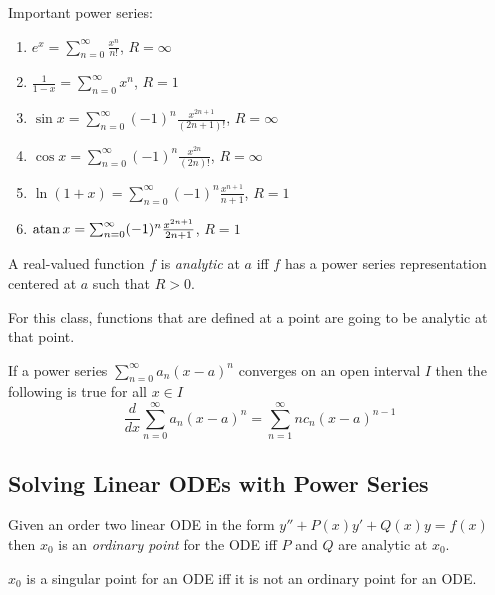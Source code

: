 \documentclass[notes]{subfiles}
\begin{document}
Important power series:
\begin{enumerate}[label = (\arabic*)]
    \item $e^x = \sum_{n = 0}^\infty \frac{x^n}{n!}$, $R = \infty$
    \item $\frac{1}{1 - x} = \sum_{n = 0}^\infty x^n$, $R = 1$
    \item $\sin x = \sum_{n = 0}^\infty (-1)^n \frac{x^{2n + 1}}{(2n + 1)!}$, $R = \infty$
    \item $\cos x = \sum_{n = 0}^\infty (-1)^n \frac{x^{2n}}{(2n)!}$, $R = \infty$
    \item $\ln(1 + x) = \sum_{n = 0}^\infty (-1)^n \frac{x^{n + 1}}{n + 1}$, $R = 1$
    \item $\operatorname{atan} x = \sum_{n = 0}^\infty (-1)^n \frac{x^{2n + 1}}{2n + 1}$, $R = 1$
\end{enumerate}

\begin{definition}
    A real-valued function $f$ is \textsl{analytic} at $a$ iff $f$ has a power series representation centered at $a$ such that $R > 0$.
\end{definition}

For this class, functions that are defined at a point are going to be analytic at that point.

\begin{theorem}
    If a power series $\sum_{n = 0}^\infty a_n(x - a)^n$ converges on an open interval $I$ then the following is true for all $x \in I$
    \[
        \frac{d}{dx} \sum_{n = 0}^\infty a_n(x - a)^n = \sum_{n = 1}^\infty nc_n(x - a)^{n - 1}
    \]
\end{theorem}

\subsection{Solving Linear ODEs with Power Series}

\begin{definition}
    Given an order two linear ODE in the form $y'' + P(x)y' + Q(x)y = f(x)$ then $x_0$ is an \textsl{ordinary point} for the ODE iff $P$ and $Q$ are analytic at $x_0$.
\end{definition}

\begin{definition}
    $x_0$ is a singular point for an ODE iff it is not an ordinary point for an ODE.
\end{definition}
\end{document}
